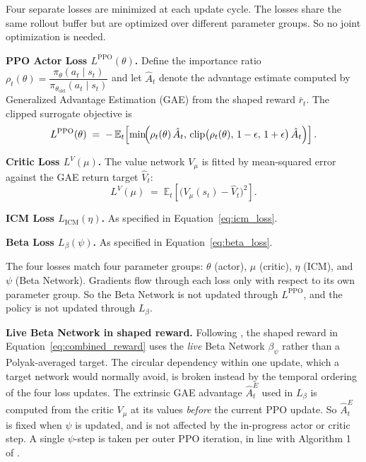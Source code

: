 Four separate losses are minimized at each update cycle. The losses share the same rollout buffer but are optimized over different parameter groups. So no joint optimization is needed.

\textbf{PPO Actor Loss $L^\text{PPO}(\theta)$.} Define the importance ratio $\rho_t(\theta) = \dfrac{\pi_\theta(a_t \mid s_t)}{\pi_{\theta_\text{old}}(a_t \mid s_t)}$ and let $\hat A_t$ denote the advantage estimate computed by Generalized Advantage Estimation (GAE) \cite{schulman2016gae} from the shaped reward $\bar r_t$. The clipped surrogate objective \cite{schulman2017ppo} is
\begin{equation}
L^\text{PPO}(\theta) \;=\;
-\,\mathbb{E}_t\!\left[
\min\!\Bigl(
\rho_t(\theta)\, \hat A_t,\,
\text{clip}\bigl(\rho_t(\theta),\, 1-\epsilon,\, 1+\epsilon\bigr)\, \hat A_t
\Bigr)\right].
\label{eq:ppo_loss}
\end{equation}

\textbf{Critic Loss $L^V(\mu)$.} The value network $V_\mu$ is fitted by mean-squared error against the GAE return target $\hat V_t$:
\begin{equation}
L^V(\mu) \;=\; \mathbb{E}_t\!\left[ \bigl( V_\mu(s_t) - \hat V_t \bigr)^2 \right].
\label{eq:critic_loss}
\end{equation}

\textbf{ICM Loss $L_\text{ICM}(\eta)$.} As specified in Equation~\eqref{eq:icm_loss}.

\textbf{Beta Loss $L_\beta(\psi)$.} As specified in Equation~\eqref{eq:beta_loss}.

The four losses match four parameter groups: $\theta$ (actor), $\mu$ (critic), $\eta$ (ICM), and $\psi$ (Beta Network). Gradients flow through each loss only with respect to its own parameter group. So the Beta Network is not updated through $L^\text{PPO}$, and the policy is not updated through $L_\beta$.

\textbf{Live Beta Network in shaped reward.} Following \cite{andres2025impact}, the shaped reward in Equation~\eqref{eq:combined_reward} uses the \emph{live} Beta Network $\beta_\psi$ rather than a Polyak-averaged target. The circular dependency within one update, which a target network would normally avoid, is broken instead by the temporal ordering of the four loss updates. The extrinsic GAE advantage $\hat A_t^{E}$ used in $L_\beta$ is computed from the critic $V_\mu$ at its values \emph{before} the current PPO update. So $\hat A_t^{E}$ is fixed when $\psi$ is updated, and is not affected by the in-progress actor or critic step. A single $\psi$-step is taken per outer PPO iteration, in line with Algorithm 1 of \cite{andres2025impact}.

